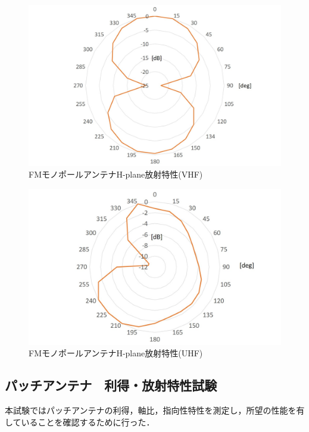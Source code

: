 \begin{figure}[H]
	\centering
	\includegraphics[scale=0.5]{04/fig/4-7-4.jpg}
	\caption{FMモノポールアンテナH-plane放射特性(VHF)}
	\label{fig4-7-4}
\end{figure}
\begin{figure}[H]
	\centering
	\includegraphics[scale=0.5]{04/fig/4-7-4-2.jpg}
	\caption{FMモノポールアンテナH-plane放射特性(UHF)}
	\label{fig4-7-4-2}
\end{figure}

\subsection{パッチアンテナ　利得・放射特性試験}
本試験ではパッチアンテナの利得，軸比，指向性特性を測定し，所望の性能を有していることを確認するために行った．

